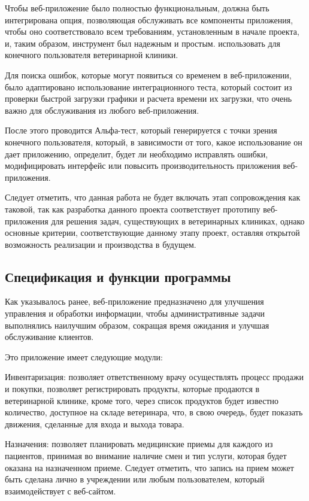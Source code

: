 Чтобы веб-приложение было полностью функциональным, должна быть интегрирована опция, позволяющая обслуживать все компоненты приложения, чтобы оно соответствовало всем требованиям, установленным в начале проекта, и, таким образом, инструмент был надежным и простым. использовать для конечного пользователя ветеринарной клиники.

Для поиска ошибок, которые могут появиться со временем в веб-приложении, было адаптировано использование интеграционного теста, который состоит из проверки быстрой загрузки графики и расчета времени их загрузки, что очень важно для обслуживания из любого веб-приложения.

После этого проводится Альфа-тест, который генерируется с точки зрения конечного пользователя, который, в зависимости от того, какое использование он дает приложению, определит, будет ли необходимо исправлять ошибки, модифицировать интерфейс или повысить производительность приложения веб-приложения.

Следует отметить, что данная работа не будет включать этап сопровождения как таковой, так как разработка данного проекта соответствует прототипу веб-приложения для решения задач, существующих в ветеринарных клиниках, однако основные критерии, соответствующие данному этапу проект, оставляя открытой возможность реализации и производства в будущем.

\subsection{Спецификация и функции программы}

Как указывалось ранее, веб-приложение предназначено для улучшения управления и обработки информации, чтобы административные задачи выполнялись наилучшим образом, сокращая время ожидания и улучшая обслуживание клиентов.

Это приложение имеет следующие модули:

Инвентаризация: позволяет ответственному врачу осуществлять процесс продажи и покупки, позволяет регистрировать продукты, которые продаются в ветеринарной клинике, кроме того, через список продуктов будет известно количество, доступное на складе ветеринара, что, в свою очередь, будет показать движения, сделанные для входа и выхода товара.

Назначения: позволяет планировать медицинские приемы для каждого из пациентов, принимая во внимание наличие смен и тип услуги, которая будет оказана на назначенном приеме. Следует отметить, что запись на прием может быть сделана лично в учреждении или любым пользователем, который взаимодействует с веб-сайтом.

